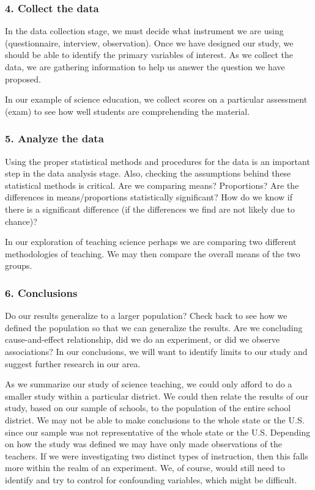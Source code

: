 \documentclass[11pt]{book}\usepackage[]{graphicx}\usepackage[]{color}
\begin{document}
\subsubsection{4. Collect the data}

In the data collection stage, we must decide what instrument we are using (questionnaire, interview, observation).  Once we have designed our study, we should be able to identify the primary variables of interest.  As we collect the data, we are gathering information to help us answer the question we have proposed.

In our example of science education, we collect scores on a particular assessment (exam) to see how well students are comprehending the material.

\subsubsection{5. Analyze the data}

Using the proper statistical methods and procedures for the data is an important step in the data analysis stage.  Also, checking the assumptions behind these statistical methods is critical.  Are we comparing means?  Proportions?  Are the differences in means/proportions statistically significant?  How do we know if there is a significant difference (if the differences we find are not likely due  to chance)?

In our exploration of teaching science perhaps we are comparing two different methodologies of teaching.  We may then compare the overall means of the two groups.

\subsubsection{6. Conclusions}

Do our results generalize to a larger population?  Check back to see how we defined the population so that we can generalize the results.  Are we concluding cause-and-effect relationship, did we do an experiment, or did we observe associations?  In our conclusions, we will want to identify limits to our study and suggest further research in our area.

As we summarize our study of science teaching, we could only afford to do a smaller study within a particular district.  We could then relate the results of our study, based on our sample of schools, to the population of the entire school district.  We may not be able to make conclusions to the whole state or the U.S. since our sample was not representative of the whole state or the U.S.  Depending on how the study was defined we may have only made observations of the teachers.  If we were investigating two distinct types of instruction, then this falls more within the realm of an experiment.  We, of course, would still need to identify and try to control for confounding variables, which might be difficult.
\end{document}
